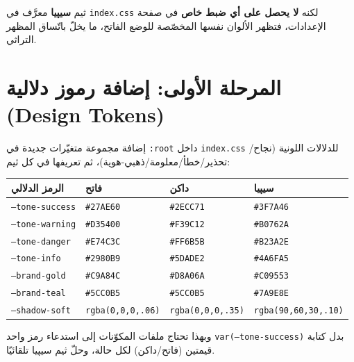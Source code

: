 \documentclass[11pt]{article}
\begin{document}
\begin{notebox}
ثيم \textbf{سيپيا} معرَّف في \texttt{index.css} لكنه \textbf{لا يحصل على أي ضبط خاص} في صفحة الإعدادات،
فتظهر الألوان نفسها المخصّصة للوضع الفاتح، ما يخلّ باتّساق المظهر التراثي.
\end{notebox}

\section{المرحلة الأولى: إضافة رموز دلالية (Design Tokens)}

إضافة مجموعة متغيّرات جديدة في \texttt{:root} داخل \texttt{index.css} للدلالات اللونية
(نجاح/تحذير/خطأ/معلومة/ذهبي-هوية)، ثم تعريفها في كل ثيم:

\vspace{6pt}
\renewcommand{\arraystretch}{1.35}
\begin{longtable}{@{}p{} p{} p{} p{}@{}}
\toprule
\textbf{الرمز الدلالي} & \textbf{فاتح} & \textbf{داكن} & \textbf{سيپيا} \\
\midrule
\endhead
\texttt{--tone-success}  & \texttt{\#27AE60} & \texttt{\#2ECC71} & \texttt{\#3F7A46} \\
\texttt{--tone-warning}  & \texttt{\#D35400} & \texttt{\#F39C12} & \texttt{\#B0762A} \\
\texttt{--tone-danger}   & \texttt{\#E74C3C} & \texttt{\#FF6B5B} & \texttt{\#B23A2E} \\
\texttt{--tone-info}     & \texttt{\#2980B9} & \texttt{\#5DADE2} & \texttt{\#4A6FA5} \\
\texttt{--brand-gold}    & \texttt{\#C9A84C} & \texttt{\#D8A06A} & \texttt{\#C09553} \\
\texttt{--brand-teal}    & \texttt{\#5CC0B5} & \texttt{\#5CC0B5} & \texttt{\#7A9E8E} \\
\texttt{--shadow-soft}   & \texttt{rgba(0,0,0,.06)} & \texttt{rgba(0,0,0,.35)} & \texttt{rgba(90,60,30,.10)} \\
\bottomrule
\end{longtable}
\renewcommand{\arraystretch}{1.0}

\begin{goalbox}
وبهذا تحتاج ملفات المكوّنات إلى استدعاء رمز واحد \texttt{var(--tone-success)} بدل كتابة قيمتين
(فاتح/داكن) لكل حالة، وحلّ ثيم سيپيا تلقائيًا.
\end{goalbox}

\end{document}
